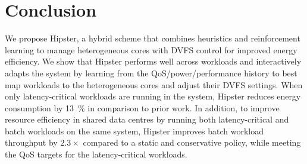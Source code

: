 \section{Conclusion}
\label{sec: conclusion-hipster}

 We propose Hipster, a hybrid scheme that combines heuristics and
reinforcement learning to manage heterogeneous cores with DVFS control for improved energy
efficiency. We show that Hipster performs well across workloads and interactively adapts
the system by learning from the QoS/power/performance history to best map workloads to the
heterogeneous cores and adjust their DVFS settings.  When only latency-critical workloads
are running in the system, Hipster reduces energy consumption by \SI{13}{\percent} in
comparison to prior work. In addition, to improve resource efficiency in shared data
centres by running both latency-critical and batch workloads on the same system, Hipster
improves batch workload throughput by $2.3\times$ compared to a static and conservative
policy, while meeting the QoS targets for the latency-critical workloads.
